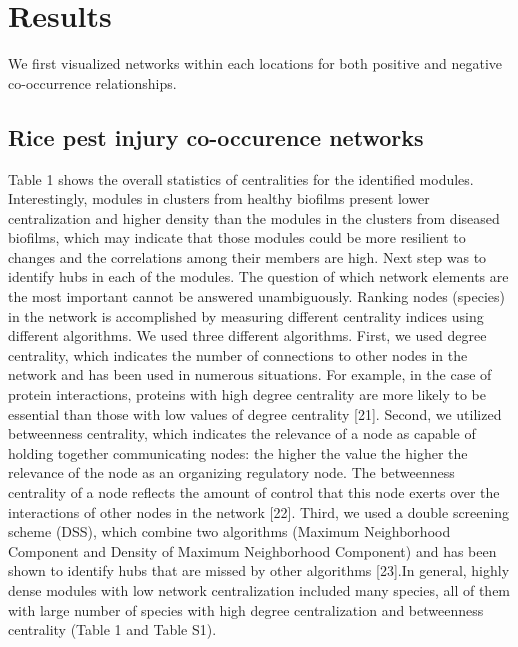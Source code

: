 \documentclass{frontiersSCNS} %
\begin{document}
\section{Results}

We first visualized networks within each locations  for both positive and negative co-occurrence relationships.


\subsection{Rice pest injury co-occurence networks}

Table 1 shows the overall statistics of centralities for the identified modules. Interestingly, modules in clusters from healthy biofilms present lower centralization and higher density than the modules in the clusters from diseased biofilms, which may indicate that those modules could be more resilient to changes and the correlations among their members are high.
Next step was to identify hubs in each of the modules. The question of which network elements are the most important cannot be answered unambiguously. Ranking nodes (species) in the network is accomplished by measuring different centrality indices using different algorithms. We used three different algorithms. First, we used degree centrality, which indicates the number of connections to other nodes in the network and has been used in numerous situations. For example, in the case of protein interactions, proteins with high degree centrality are more likely to be essential than those with low values of degree centrality [21]. Second, we utilized betweenness centrality, which indicates the relevance of a node as capable of holding together communicating nodes: the higher the value the higher the relevance of the node as an organizing regulatory node. The betweenness centrality of a node reflects the amount of control that this node exerts over the interactions of other nodes in the network [22]. Third, we used a double screening scheme (DSS), which combine two algorithms (Maximum Neighborhood Component and Density of Maximum Neighborhood Component) and has been shown to identify hubs that are missed by other algorithms [23].In general, highly dense modules with low network centralization included many species, all of them with large number of species with high degree centralization and betweenness centrality (Table 1 and Table S1).
\end{document}
